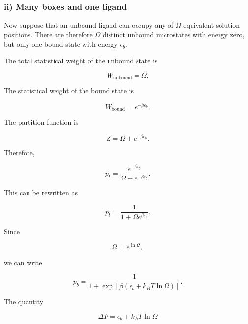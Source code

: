 \subsubsection*{ii) Many boxes and one ligand}

Now suppose that an unbound ligand can occupy any of $\Omega$ equivalent solution positions.
There are therefore $\Omega$ distinct unbound microstates with energy zero, but only one bound state with energy $\epsilon_b$.

The total statistical weight of the unbound state is

\begin{equation}
    W_{\mathrm{unbound}}=\Omega.
\end{equation}

The statistical weight of the bound state is

\begin{equation}
    W_{\mathrm{bound}}=e^{-\beta\epsilon_b}.
\end{equation}

The partition function is

\begin{equation}
    Z=\Omega+e^{-\beta\epsilon_b}.
\end{equation}

Therefore,

\begin{equation}
    p_b=\frac{e^{-\beta\epsilon_b}}{\Omega+e^{-\beta\epsilon_b}}.
\end{equation}

This can be rewritten as

\begin{equation}
    p_b=\frac{1}{1+\Omega e^{\beta\epsilon_b}}.
\end{equation}

Since

\begin{equation}
    \Omega=e^{\ln\Omega},
\end{equation}

we can write

\begin{equation}
    p_b=\frac{1}{1+\exp\left[\beta\left(\epsilon_b+k_BT\ln\Omega\right)\right]}.
\end{equation}

The quantity

\begin{equation}
    \Delta F=\epsilon_b+k_BT\ln\Omega
\end{equation}

